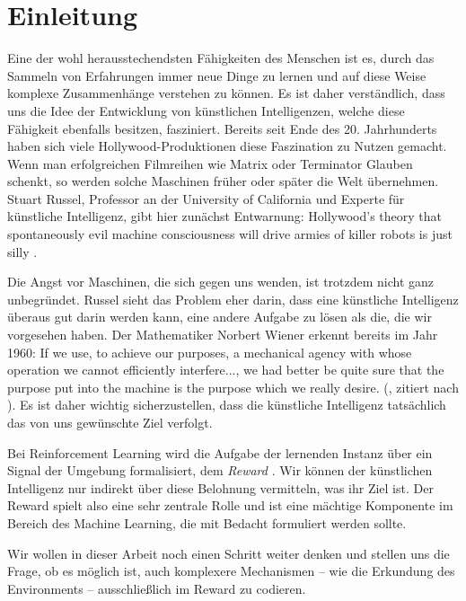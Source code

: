 \chapter{Einleitung} \label{sec:introduction}
Eine der wohl herausstechendsten Fähigkeiten des Menschen ist es, durch das Sammeln von Erfahrungen immer neue Dinge zu lernen und auf diese Weise komplexe Zusammenhänge verstehen zu können. Es ist daher verständlich, dass uns die Idee der Entwicklung von künstlichen Intelligenzen, welche diese Fähigkeit ebenfalls besitzen, fasziniert. Bereits seit Ende des 20. Jahrhunderts haben sich viele Hollywood-Produktionen diese Faszination zu Nutzen gemacht. Wenn man erfolgreichen Filmreihen wie \glqq Matrix\grqq{} oder \glqq Terminator\grqq{} Glauben schenkt, so werden solche Maschinen früher oder später die Welt übernehmen. Stuart Russel, Professor an der University of California und Experte für künstliche Intelligenz, gibt hier zunächst Entwarnung: \glqq Hollywood's theory that spontaneously evil machine consciousness will drive armies of killer robots is just silly\grqq{} \cite{14_russell2016should}.

Die Angst vor Maschinen, die sich gegen uns wenden, ist trotzdem nicht ganz unbegründet. Russel sieht das Problem eher darin, dass eine künstliche Intelligenz überaus gut darin werden kann, eine andere Aufgabe zu lösen als die, die wir vorgesehen haben. Der Mathematiker Norbert Wiener erkennt bereits im Jahr 1960: \glqq If we use, to achieve our purposes, a mechanical agency with whose operation we cannot efficiently interfere..., we had better be quite sure that the purpose put into the machine is the purpose which we really desire.\grqq{} (\cite{14-2_wiener1960some}, zitiert nach \cite{14_russell2016should}). Es ist daher wichtig sicherzustellen, dass die künstliche Intelligenz tatsächlich das von uns gewünschte Ziel verfolgt.

Bei Reinforcement Learning wird die Aufgabe der lernenden Instanz über ein Signal der Umgebung formalisiert, dem \textit{Reward} \cite{06_sutton2018reinforcement}. Wir können der künstlichen Intelligenz nur indirekt über diese Belohnung vermitteln, was ihr Ziel ist. Der Reward spielt also eine sehr zentrale Rolle und ist eine mächtige Komponente im Bereich des Machine Learning, die mit Bedacht formuliert werden sollte.

Wir wollen in dieser Arbeit noch einen Schritt weiter denken und stellen uns die Frage, ob es möglich ist, auch komplexere Mechanismen -- wie die Erkundung des Environments -- ausschließlich im Reward zu codieren.

